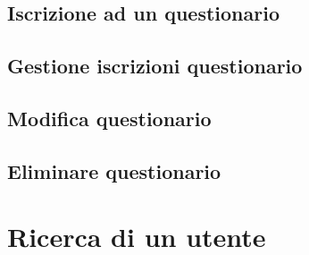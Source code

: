 \subsection{Iscrizione ad un questionario}
\subsection{Gestione iscrizioni questionario}
\subsection{Modifica questionario}
\subsection{Eliminare questionario}

\section{Ricerca di un utente}
